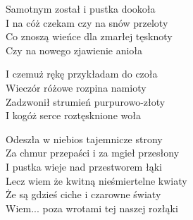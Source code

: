 \begin{text}
    Samotnym został i pustka dookoła\\
    I na cóż czekam czy na snów przeloty\\
    Co znoszą wieńce dla zmarłej tęsknoty\\
    Czy na nowego zjawienie anioła

    I czemuż rękę przykładam do czoła\\
    Wieczór różowe rozpina namioty\\
    Zadzwonił strumień purpurowo-złoty\\
    I kogóż serce roztęsknione woła

    Odeszła w niebios tajemnicze strony\\
    Za chmur przepaści i za mgieł przesłony\\
    I pustka wieje nad przestworem łąki\\
    Lecz wiem że kwitną nieśmiertelne kwiaty\\
    Że są gdzieś ciche i czarowne światy\\
    Wiem... poza wrotami tej naszej rozłąki
\end{text}
\begin{chord}

\end{chord}